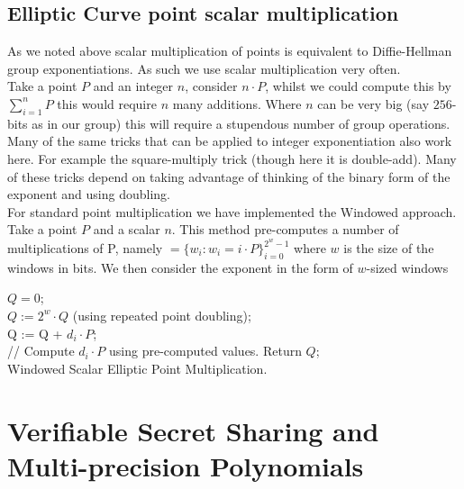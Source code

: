 \documentclass[ %
                    author={Nicholas Tutte},
                supervisor={Prof. Nigel Smart},
                    degree={MEng},
                     title={Secure Two Party Computation},
                  subtitle={A practical comparison of recent protocols},
                      type={Research - GG1K},
                      year={2015} ]{dissertation}
\begin{document}
			\subsection{Elliptic Curve point scalar multiplication}
				As we noted above scalar multiplication of points is equivalent to Diffie-Hellman group exponentiations. As such we use scalar multiplication very often.\\

				Take a point $P$ and an integer $n$, consider $n \cdot P$, whilst we could compute this by $\sum_{i = 1}^{n}P$ this would require $n$ many additions. Where $n$ can be very big (say $256$-bits as in our group) this will require a stupendous number of group operations.\\

				 Many of the same tricks that can be applied to integer exponentiation also work here. For example the square-multiply trick (though here it is double-add). Many of these tricks depend on taking advantage of thinking of the binary form of the exponent and using doubling.\\

				 For standard point multiplication we have implemented the Windowed approach. Take a point $P$ and a scalar $n$. This method pre-computes a number of multiplications of P, namely $ = \{w_i : w_i = i \cdot P\}_{i = 0}^{2^w - 1}$ where $w$ is the size of the windows in bits. We then consider the exponent in the form of $w$-sized windows

				 \begin{mdframed}
					\begin{algorithm}[H]
						$Q = 0$;\\[0.25cm]
						{
							$Q := 2^w \cdot Q$ (using repeated point doubling);\\[0.25cm]
							{
								Q := Q + $d_i \cdot P$;\\[0.25cm]
								// Compute $d_i \cdot P$ using pre-computed values.
							}
						}
						Return $Q$;\\[0.25cm]

						\caption{Windowed Scalar Elliptic Point Multiplication. }
					\end{algorithm}

				\end{mdframed}



		\section{Verifiable Secret Sharing and Multi-precision Polynomials}
\end{document}

